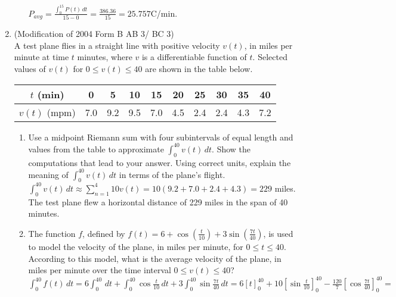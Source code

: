 \documentclass[10pt, letterpaper]{report}
\begin{document}
\begin{enumerate}
\begin{enumerate}
      $P_{avg}=\frac{\int_{0}^{15}{P(t)}\,dt}{15-0}=\frac{386.36}{15}=25.757$\degree C/min. \\

  \end{enumerate}
  \hline
  \item{(Modification of 2004 Form B AB 3/ BC 3) \\
  A test plane flies in a straight line with positive velocity $v(t)$, in miles per minute at time $t$ minutes, where $v$ is a differentiable function of $t$. Selected values of $v(t)$ for $0\leq v(t)\leq 40$ are shown in the table below.
  \begin{center}
    \begin{tabular}{| c | c | c | c | c | c | c | c | c | c |}
      \hline
      $t$ (min) & 0 & 5 & 10 & 15 & 20 & 25 & 30 & 35 & 40 \\
      \hline
      $v(t)$ (mpm) & 7.0 & 9.2 & 9.5 & 7.0 & 4.5 & 2.4 & 2.4 & 4.3 & 7.2 \\
      \hline
    \end{tabular}
  \end{center}}
  \begin{enumerate}
    \item{Use a midpoint Riemann sum with four subintervals of equal length and values from the table to approximate $\int_{0}^{40}{v(t)}\,dt$. Show the computations that lead to your answer. Using correct units, explain the meaning of $\int_{0}^{40}{v(t)}\,dt$ in terms of the plane's flight.} \\

      $\int_{0}^{40}{v(t)}\,dt\approx
      \sum_{n=1}^{4}{10v(t)}=10(9.2+7.0+2.4+4.3)=229$ miles. \\

      The test plane flew a horizontal distance of 229 miles in the span of 40 minutes. \\

    \item{The function $f$, defined by $f(t)=6+\cos{\left(\frac{t}{10}\right)}+3\sin{\left(\frac{7t}{40}\right)}$, is used to model the velocity of the plane, in miles per minute, for $0\leq t\leq 40$. According to this model, what is the average velocity of the plane, in miles per minute over the time interval $0\leq v(t)\leq 40$?} \\

      $\int_{0}^{40}{f(t)}\,dt=
      6\int_{0}^{40}{}\,dt+\int_{0}^{40}{\cos{\frac{t}{10}}}\,dt+3\int_{0}^{40}{\sin{\frac{7t}{40}}}\,dt=
      6[t]_{0}^{40}+10[\sin{\frac{t}{10}}]_{0}^{40}-\frac{120}{7}[\cos{\frac{7t}{40}}]_{0}^{40}=$ \\


\end{enumerate}
\end{enumerate}
\end{document}
